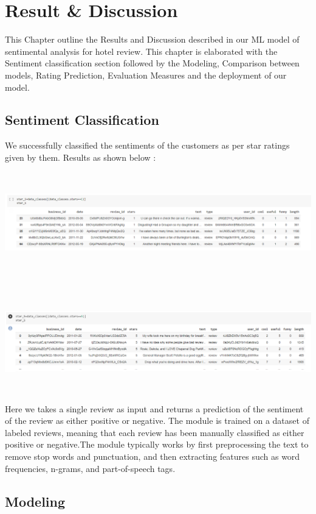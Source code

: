 \documentclass[a4paper, 12pt]{report}
\begin{document}
\chapter{Result \& Discussion}
This Chapter outline the Results and Discussion described in our ML model of sentimental analysis for hotel review. This chapter is elaborated with the Sentiment classification section followed by the Modeling, Comparison between models, Rating Prediction, Evaluation Measures and the deployment of our model.
\section{Sentiment Classification}
We successfully classified the sentiments of the customers as per star ratings given by them. Results as shown below :\\
\includegraphics[height=2in,width=6in]{24}\\
\includegraphics[height=2in,width=6in]{26}\\
Here we takes a single review as input and returns a prediction of the sentiment of the review as either positive or negative. The module is trained on a dataset of labeled reviews, meaning that each review has been manually classified as either positive or negative.The module typically works by first preprocessing the text to remove stop words and punctuation, and then extracting features such as word frequencies, n-grams, and part-of-speech tags.
\section{Modeling}
\end{document}
